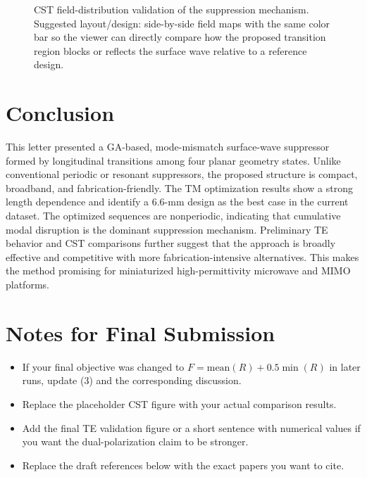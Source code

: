 \documentclass[journal]{IEEEtran}
\begin{document}
\begin{figure}[t]
\centering
{}
\caption{CST field-distribution validation of the suppression mechanism. Suggested layout/design: side-by-side field maps with the same color bar so the viewer can directly compare how the proposed transition region blocks or reflects the surface wave relative to a reference design.}
\label{fig:cst_field}
\end{figure}

\section{Conclusion}
This letter presented a GA-based, mode-mismatch surface-wave suppressor formed by longitudinal transitions among four planar geometry states. Unlike conventional periodic or resonant suppressors, the proposed structure is compact, broadband, and fabrication-friendly. The TM optimization results show a strong length dependence and identify a 6.6-mm design as the best case in the current dataset. The optimized sequences are nonperiodic, indicating that cumulative modal disruption is the dominant suppression mechanism. Preliminary TE behavior and CST comparisons further suggest that the approach is broadly effective and competitive with more fabrication-intensive alternatives. This makes the method promising for miniaturized high-permittivity microwave and MIMO platforms.

\section*{Notes for Final Submission}
\begin{itemize}
\item If your final objective was changed to $F=\mathrm{mean}(R)+0.5\min(R)$ in later runs, update (3) and the corresponding discussion.
\item Replace the placeholder CST figure with your actual comparison results.
\item Add the final TE validation figure or a short sentence with numerical values if you want the dual-polarization claim to be stronger.
\item Replace the draft references below with the exact papers you want to cite.
\end{itemize}
\end{document}
